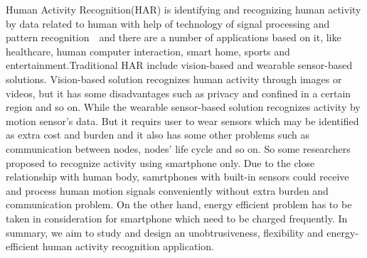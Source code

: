 \begin{enabstract}
\par  Human Activity Recognition(HAR) is identifying and recognizing human activity by data related to human with help of technology of signal processing and pattern recognition　and there are a number of applications based on it, like healthcare,
human computer interaction, smart home, sports and entertainment.Traditional HAR include vision-based and wearable sensor-based solutions. Vision-based solution recognizes human activity through images or videos, but it has some disadvantages such as privacy and confined in a certain region and so on. While the wearable sensor-based solution recognizes activity by motion sensor's data. But it requirs user to wear sensors which may be identified as extra cost and burden and it also has some other problems such as communication between nodes, nodes' life cycle and so on. So some researchers proposed to recognize activity using smartphone only. Due to the close relationship with human body, samrtphones with built-in sensors could receive and process human motion signals conveniently without extra burden and communication problem. On the other hand, energy efficient problem has to be taken in consideration for smartphone which need to be charged frequently. In summary, we aim to study and design an unobtrusiveness, flexibility and energy-efficient human activity recognition application.
\begin{enumerate}
	

\end{enumerate}
\end{enabstract}
